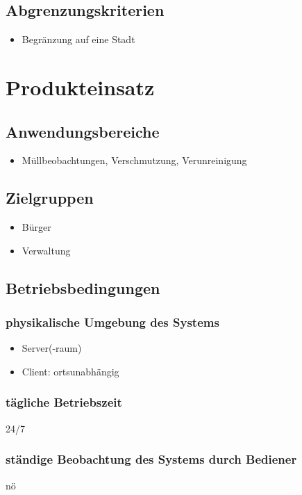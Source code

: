 \documentclass[a4paper,11pt]{article}             %
\begin{document}
	\subsection{Abgrenzungskriterien}
		\begin{itemize}
			\item Begränzung auf eine Stadt
		\end{itemize}
\section{Produkteinsatz}
	\subsection{Anwendungsbereiche}
		\begin{itemize}
			\item Müllbeobachtungen, Verschmutzung, Verunreinigung
		\end{itemize}
	\subsection{Zielgruppen}
		\begin{itemize}
			\item Bürger
			\item Verwaltung
		\end{itemize}
	\subsection{Betriebsbedingungen}
		\subsubsection{physikalische Umgebung des Systems}
			\begin{itemize}
				\item Server(-raum)
				\item Client: ortsunabhängig
			\end{itemize}
		\subsubsection{tägliche Betriebszeit}
			24/7
		\subsubsection{ständige Beobachtung des Systems durch Bediener}
			nö
\end{document}

